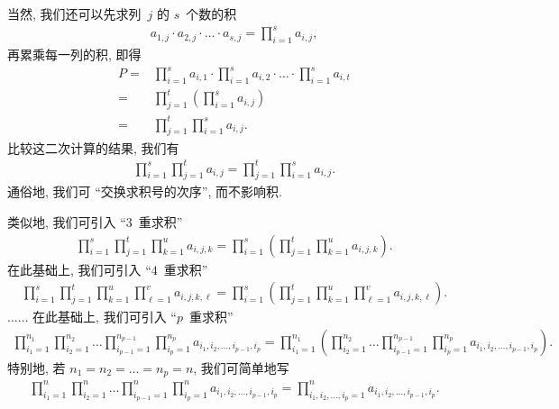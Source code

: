 当然, 我们还可以先求列~\(j\) 的 \(s\)~个数的积
\begin{align*}
    a_{1,j} \cdot a_{2,j} \cdot \dots \cdot a_{s,j}
    = \prod_{i = 1}^{s} {a_{i,j}},
\end{align*}
再累乘每一列的积, 即得
\begin{align*}
    P
    = {} & \prod_{i = 1}^{s} {a_{i,1}}
    \cdot \prod_{i = 1}^{s} {a_{i,2}}
    \cdot \dots
    \cdot \prod_{i = 1}^{s} {a_{i,t}}
    \\
    = {} &
    \prod_{j = 1}^{t}
    {\left( \prod_{i = 1}^{s} {a_{i,j}} \right)}
    \\
    = {} &
    \prod_{j = 1}^{t}
    {\prod_{i = 1}^{s} {a_{i,j}}}.
\end{align*}
比较这二次计算的结果, 我们有
\begin{align*}
    \prod_{i = 1}^{s} {\prod_{j = 1}^{t} {a_{i,j}}}
    = \prod_{j = 1}^{t} {\prod_{i = 1}^{s} {a_{i,j}}}.
\end{align*}
通俗地, 我们可 ``交换求积号的次序'', 而不影响积.

类似地, 我们可引入 ``\(3\)~重求积''
\begin{align*}
    \prod_{i = 1}^{s} {
    \prod_{j = 1}^{t} {
    \prod_{k = 1}^{u} {
    a_{i,j,k} }}}
    =
    \prod_{i = 1}^{s}
    {\left(
    \prod_{j = 1}^{t} {
        \prod_{k = 1}^{u} {
            a_{i,j,k} }}
    \right)}.
\end{align*}
在此基础上, 我们可引入 ``\(4\)~重求积''
\begin{align*}
    \prod_{i = 1}^{s} {
    \prod_{j = 1}^{t} {
    \prod_{k = 1}^{u} {
    \prod_{\ell = 1}^{v} {
    a_{i,j,k,\ell} }}}}
    =
    \prod_{i = 1}^{s}
    {\left(
    \prod_{j = 1}^{t} {
        \prod_{k = 1}^{u} {
            \prod_{\ell = 1}^{v} {
                a_{i,j,k,\ell} }}}
    \right)}.
\end{align*}
\(\dots \dots\)
在此基础上, 我们可引入 ``\(p\)~重求积''
\begin{align*}
    \prod_{i_1 = 1}^{n_1} {
    \prod_{i_2 = 1}^{n_2} {
    \dots
    \prod_{i_{p-1} = 1}^{n_{p-1}} {
    \prod_{i_p = 1}^{n_p} {
    a_{i_1,i_2,\dots,i_{p-1},i_p} }}}}
    = \prod_{i_1 = 1}^{n_1}
    {\left(
    \prod_{i_2 = 1}^{n_2} {
        \dots
        \prod_{i_{p-1} = 1}^{n_{p-1}} {
            \prod_{i_p = 1}^{n_p} {
                a_{i_1,i_2,\dots,i_{p-1},i_p} }}}
    \right)}.
\end{align*}
特别地, 若 \(n_1 = n_2 = \dots = n_p = n\),
我们可简单地写
\begin{align*}
    \prod_{i_1 = 1}^{n} {
    \prod_{i_2 = 1}^{n} {
    \dots
    \prod_{i_{p-1} = 1}^{n} {
    \prod_{i_p = 1}^{n} {
    a_{i_1,i_2,\dots,i_{p-1},i_p} }}}}
    =
    \prod_{i_1,i_2,\dots,i_p = 1}^{n}
    {a_{i_1,i_2,\dots,i_{p-1},i_p}}.
\end{align*}

